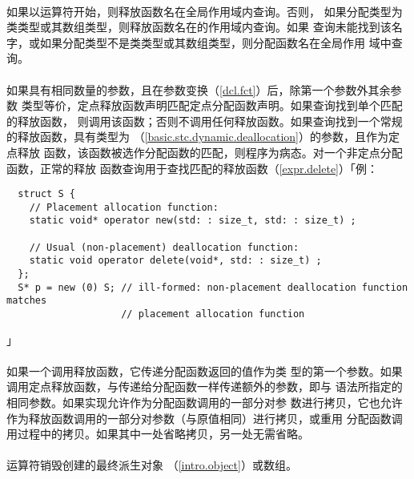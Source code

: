 \paragraph{}
如果以\tm{::}运算符开始，则释放函数名在全局作用域内查询。否则，
如果分配类型为类类型或其数组类型，则释放函数名在的作用域内查询。如果
查询未能找到该名字，或如果分配类型不是类类型或其数组类型，则分配函数名在全局作用
域中查询。

\paragraph{}
如果具有相同数量的参数，且在参数变换（\ref{dcl.fct}）后，除第一个参数外其余参数
类型等价，定点释放函数声明匹配定点分配函数声明。如果查询找到单个匹配的释放函数，
则调用该函数；否则不调用任何释放函数。如果查询找到一个常规的释放函数，具有类型为
（\ref{basic.stc.dynamic.deallocation}）的参数，且作为定点释放
函数，该函数被选作分配函数的匹配，则程序为病态。对一个非定点分配函数，正常的释放
函数查询用于查找匹配的释放函数（\ref{expr.delete}）「例：
\begin{lstlisting}
  struct S {
    // Placement allocation function:
    static void* operator new(std: : size_t, std: : size_t) ;

    // Usual (non-placement) deallocation function:
    static void operator delete(void*, std: : size_t) ;
  };
  S* p = new (0) S; // ill-formed: non-placement deallocation function matches
                    // placement allocation function
\end{lstlisting}」

\paragraph{}
如果一个调用释放函数，它传递分配函数返回的值作为类
型的第一个参数。如果调用定点释放函数，与传递给分配函数一样传递额外的参数，即与
语法所指定的相同参数。如果实现允许作为分配函数调用的一部分对参
数进行拷贝，它也允许作为释放函数调用的一部分对参数（与原值相同）进行拷贝，或重用
分配函数调用过程中的拷贝。如果其中一处省略拷贝，另一处无需省略。

\paragraph{}
运算符销毁创建的最终派生对象
（\ref{intro.object}）或数组。

